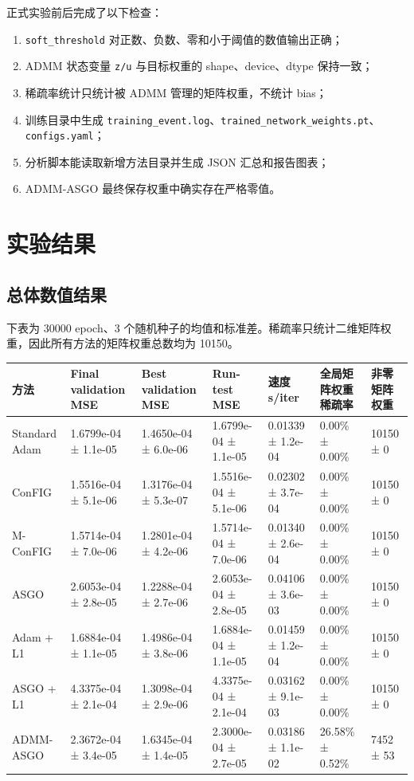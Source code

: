 \documentclass[UTF8,a4paper,12pt,fontset=none]{ctexart}
\begin{document}
正式实验前后完成了以下检查：

\begin{enumerate}
\item \texttt{soft\_threshold} 对正数、负数、零和小于阈值的数值输出正确；
\item ADMM 状态变量 \texttt{z/u} 与目标权重的 shape、device、dtype 保持一致；
\item 稀疏率统计只统计被 ADMM 管理的矩阵权重，不统计 bias；
\item 训练目录中生成 \texttt{training\_event.log}、\texttt{trained\_network\_weights.pt}、\texttt{configs.yaml}；
\item 分析脚本能读取新增方法目录并生成 JSON 汇总和报告图表；
\item ADMM-ASGO 最终保存权重中确实存在严格零值。
\end{enumerate}

\section{实验结果}

\subsection{总体数值结果}

下表为 30000 epoch、3 个随机种子的均值和标准差。稀疏率只统计二维矩阵权重，因此所有方法的矩阵权重总数均为 10150。

\begingroup
\scriptsize
\begin{longtable}{p{}p{}p{}p{}p{}p{}p{}}
\toprule
方法 & Final validation MSE & Best validation MSE & Run-test MSE & 速度 s/iter & 全局矩阵权重稀疏率 & 非零矩阵权重 \\
\midrule
Standard Adam & 1.6799e-04 ± 1.1e-05 & 1.4650e-04 ± 6.0e-06 & 1.6799e-04 ± 1.1e-05 & 0.01339 ± 1.2e-04 & 0.00\% ± 0.00\% & 10150 ± 0 \\
ConFIG & 1.5516e-04 ± 5.1e-06 & 1.3176e-04 ± 5.3e-07 & 1.5516e-04 ± 5.1e-06 & 0.02302 ± 3.7e-04 & 0.00\% ± 0.00\% & 10150 ± 0 \\
M-ConFIG & 1.5714e-04 ± 7.0e-06 & 1.2801e-04 ± 4.2e-06 & 1.5714e-04 ± 7.0e-06 & 0.01340 ± 2.6e-04 & 0.00\% ± 0.00\% & 10150 ± 0 \\
ASGO & 2.6053e-04 ± 2.8e-05 & 1.2288e-04 ± 2.7e-06 & 2.6053e-04 ± 2.8e-05 & 0.04106 ± 3.6e-03 & 0.00\% ± 0.00\% & 10150 ± 0 \\
Adam + L1 & 1.6884e-04 ± 1.1e-05 & 1.4986e-04 ± 3.8e-06 & 1.6884e-04 ± 1.1e-05 & 0.01459 ± 1.2e-04 & 0.00\% ± 0.00\% & 10150 ± 0 \\
ASGO + L1 & 4.3375e-04 ± 2.1e-04 & 1.3098e-04 ± 2.9e-06 & 4.3375e-04 ± 2.1e-04 & 0.03162 ± 9.1e-03 & 0.00\% ± 0.00\% & 10150 ± 0 \\
ADMM-ASGO & 2.3672e-04 ± 3.4e-05 & 1.6345e-04 ± 1.4e-05 & 2.3000e-04 ± 2.7e-05 & 0.03186 ± 1.1e-02 & 26.58\% ± 0.52\% & 7452 ± 53 \\
\bottomrule
\end{longtable}
\endgroup
\end{document}
